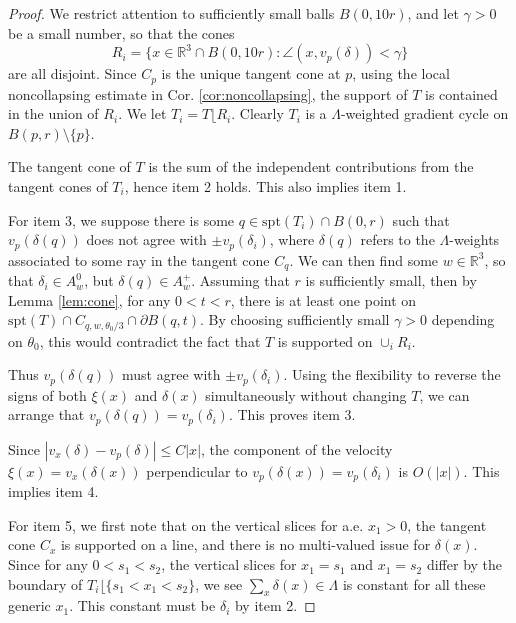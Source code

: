 \documentclass{article}
\theoremstyle{definition}
\newcommand{\R}{\mathbb{R}}
\begin{document}
			
			
			
			
			\begin{proof}
				We restrict attention to sufficiently small balls $B(0, 10r)$, and let $\gamma>0$ be a small number, so that the cones
				\[
				R_i= \{    x\in   \R^3\cap B(0,10r)  : \angle (x ,  v_p(\delta) ) < \gamma    \}
				\]
				are all disjoint. Since $C_p$ is the unique tangent cone at $p$, using the local noncollapsing estimate in Cor. \ref{cor:noncollapsing}, the support of $T$ is contained in the union of $R_i$. We let $T_i = T\lfloor R_i$. Clearly $T_i$ is a $\Lambda$-weighted gradient cycle on $B(p,r)\setminus \{ p\}$.
				
				
				
				
			The tangent cone of $T$ is the sum of the independent contributions from the tangent cones of $T_i$, hence item 2 holds. This also implies item 1. 
			
			
			
			
			For item 3, we suppose there is some $q \in \text{spt}(T_i)\cap B(0, r)$ such that $v_p(\delta(q) )$ does not agree with $\pm v_p(\delta_i)$, where $\delta(q)$ refers to  the $\Lambda$-weights associated to some ray in the tangent cone $C_q$. We can then find some $w\in \R^3$,  so that $\delta_i\in A_w^0$, but $\delta(q)\in A_w^+$. Assuming that $r$ is sufficiently small, then by Lemma \ref{lem:cone}, 
			 for any $0<t< r$, there is at least one point on $\text{spt}(T)\cap C_{q,w,\theta_0/3}\cap \partial B(q,t)$. By choosing sufficiently small $\gamma>0$ depending on $\theta_0$, this would contradict the fact that $T$ is supported on $\cup_i R_i$. 
			
			
			Thus $v_p(\delta(q))$ must agree with $\pm v_p(\delta_i)$. Using the flexibility to reverse the signs of both $\xi(x)$ and $\delta(x)$ simultaneously without changing $T$, we can arrange that $v_p(\delta(q)) = v_p(\delta_i)$. This proves item 3.
			
			
			
			
			Since $|v_x(\delta)- v_p(\delta)| \leq C|x|$, the component of the velocity $\xi(x)= v_x(\delta(x))$ perpendicular to $v_p (\delta(x)) = v_p (\delta_i)$ is $O(|x|)$. This implies item 4. 
			
			
			
			For item 5, we first note that on the vertical slices for a.e. $x_1>0$, the tangent cone $C_x$ is supported on a line, and there is no multi-valued issue for $\delta(x)$. Since for any $0<s_1<s_2$, the vertical slices for $x_1=s_1$ and $x_1=s_2$ differ by the boundary of $T_i \lfloor \{  s_1< x_1<s_2     \}$, we see $\sum_x \delta(x)\in \Lambda$ is constant for all these generic $x_1$. This constant must be $\delta_i$ by item 2. 
			

\end{proof}
\end{document}
